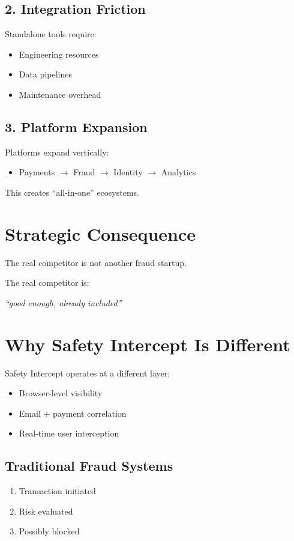 \documentclass[11pt]{article}
\begin{document}
\subsection{2. Integration Friction}
Standalone tools require:
\begin{itemize}
    \item Engineering resources
    \item Data pipelines
    \item Maintenance overhead
\end{itemize}

\subsection{3. Platform Expansion}
Platforms expand vertically:
\begin{itemize}
    \item Payments $\rightarrow$ Fraud $\rightarrow$ Identity $\rightarrow$ Analytics
\end{itemize}

This creates ``all-in-one'' ecosystems.

\section{Strategic Consequence}

The real competitor is not another fraud startup.

The real competitor is:
\begin{center}
\textit{``good enough, already included''}
\end{center}

\section{Why Safety Intercept Is Different}

Safety Intercept operates at a different layer:

\begin{itemize}
    \item Browser-level visibility
    \item Email + payment correlation
    \item Real-time user interception
\end{itemize}

\subsection{Traditional Fraud Systems}
\begin{enumerate}
    \item Transaction initiated
    \item Risk evaluated
    \item Possibly blocked
\end{enumerate}
\end{document}
